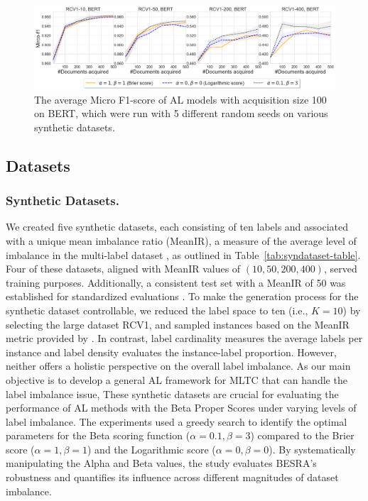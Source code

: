 \documentclass[letterpaper]{article} %
\begin{document}
\begin{figure}[!t]
\centering
\includegraphics[width=1\textwidth]{figures/syn_rcv1meanIR50_mircof1.png}
    \caption{The average Micro F1-score of AL models with acquisition size 100 on BERT, which were run with 5 different random seeds on various synthetic datasets.}
\label{fig:syn_rcv1meanIR50_mircof1}
\end{figure}

\subsection{Datasets}


\subsubsection{Synthetic Datasets.}
We created five synthetic datasets, each consisting of ten labels and associated with a unique mean imbalance ratio (MeanIR), a measure of the average level of imbalance in the multi-label dataset \cite{CHARTE20153}, as outlined in Table~\ref{tab:syndataset-table}.
Four of these datasets, aligned with MeanIR values of $(10, 50, 200, 400)$, served training purposes. Additionally, a consistent test set with a MeanIR of 50 was established for standardized evaluations \cite{wang2023imbalanced}.
To make the generation process for the synthetic dataset controllable,
we reduced the label space to ten (i.e., $K=10$) by selecting the large dataset RCV1, and sampled instances based on the MeanIR metric provided by \citet{CHARTE20153}.
In contrast, label cardinality measures the average labels per instance and label density evaluates the instance-label proportion. However, neither offers a holistic perspective on the overall label imbalance.
As our main objective is to develop a general AL framework for MLTC that can handle the label imbalance issue,
These synthetic datasets are crucial for evaluating the performance of AL methods with the Beta Proper Scores under varying levels of label imbalance.
The experiments used a greedy search to identify the optimal parameters for the Beta scoring function ($\alpha = 0.1, \beta = 3$) compared to the Brier score ($\alpha = 1, \beta = 1$) and the Logarithmic score ($\alpha = 0, \beta = 0$).
By systematically manipulating the Alpha and Beta values, the study evaluates BESRA's robustness and quantifies its influence across different magnitudes of dataset imbalance.
\end{document}
